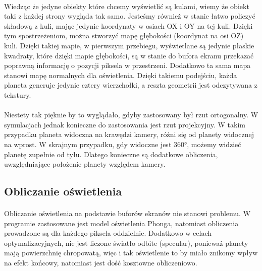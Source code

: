 \paragraph{}

Wiedząc że jedyne obiekty które chcemy wyświetlić są kulami, wiemy że obiekt taki z każdej strony wygląda tak samo. Jesteśmy również w stanie łatwo policzyć składową z kuli, mając jedynie koordynaty w osiach OX i OY na tej kuli. Dzięki tym spostrzeżeniom, można stworzyć mapę głębokości (koordynat na osi OZ) kuli. Dzięki takiej mapie, w pierwszym przebiegu, wyświetlane są jedynie płaskie kwadraty, które dzięki mapie głębokości, są w stanie do bufora ekranu przekazać poprawną informację o pozycji piksela w przestrzeni. Dodatkowo ta sama mapa stanowi mapę normalnych dla oświetlenia. Dzięki takiemu podejściu, każda planeta generuje jedynie cztery wierzchołki, a reszta geometrii jest odczytywana z tekstury.

\paragraph{}

Niestety tak pięknie by to wyglądało, gdyby zastosowany był rzut ortogonalny. W symulacjach jednak konieczne do zastosowania jest rzut projekcyjny. W takim przypadku planeta widoczna na krawędzi kamery, różni się od planety widocznej na wprost. W skrajnym przypadku, gdy widoczne jest 360°, możemy widzieć planetę zupełnie od tyłu. Dlatego konieczne są dodatkowe obliczenia, uwzględniające położenie planety względem kamery.

\subsection{Obliczanie oświetlenia}\label{sub:obliczanie oświetlenia}
\paragraph{}

Obliczanie oświetlenia na podstawie buforów ekranów nie stanowi problemu. W programie zastosowane jest model oświetlenia Phonga, natomiast obliczenia prowadzone są dla każdego piksela oddzielnie. Dodatkowo w celach optymalizacyjnych, nie jest liczone światło odbite (specular), ponieważ planety mają powierzchnię chropowatą, więc i tak oświetlenie to by miało znikomy wpływ na efekt końcowy, natomiast jest dość kosztowne obliczeniowo.

\paragraph{}

